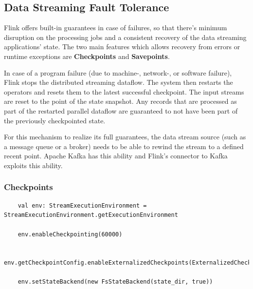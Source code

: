 \subsection{Data Streaming Fault Tolerance}

Flink offers built-in guarantees in case of failures, so that there's minimum disruption on the processing jobs and a consistent recovery of the data streaming applications' state. The two main features which allows recovery from errors or runtime exceptions are \textbf{Checkpoints} and \textbf{Savepoints}.

In case of a program failure (due to machine-, network-, or software failure), Flink stops the distributed streaming dataflow. The system then restarts the operators and resets them to the latest successful checkpoint. The input streams are reset to the point of the state snapshot. Any records that are processed as part of the restarted parallel dataflow are guaranteed to not have been part of the previously checkpointed state.

For this mechanism to realize its full guarantees, the data stream source (such as a message queue or a broker) needs to be able to rewind the stream to a defined recent point. Apache Kafka has this ability and Flink’s connector to Kafka exploits this ability.

\subsubsection{Checkpoints}

\begin{code}
    \label{code:checkpointing}
    \begin{verbatim}
    val env: StreamExecutionEnvironment = StreamExecutionEnvironment.getExecutionEnvironment
    
    env.enableCheckpointing(60000)
    
    env.getCheckpointConfig.enableExternalizedCheckpoints(ExternalizedCheckpointCleanup.RETAIN_ON_CANCELLATION)
    
    env.setStateBackend(new FsStateBackend(state_dir, true)) 
    \end{verbatim}
\end{code}~\\

